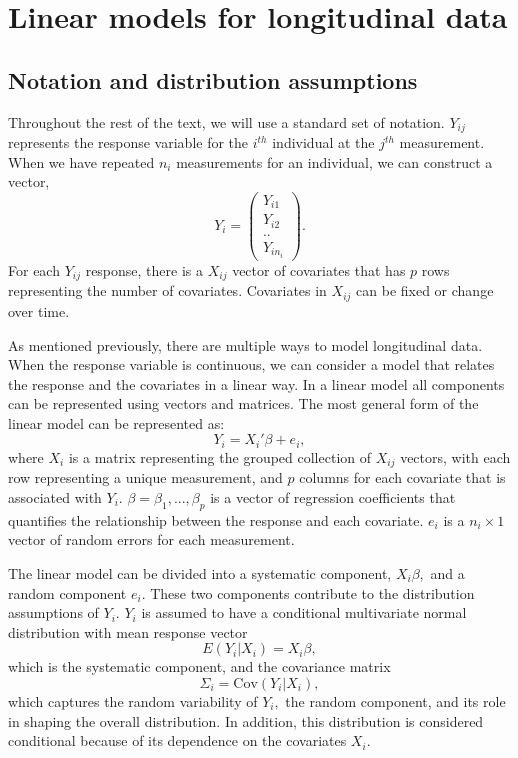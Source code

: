 \documentclass[12pt, twoside]{amherstthesis}
\begin{document}
\hypertarget{linear-models-for-longitudinal-data}{%
\section{Linear models for longitudinal data}\label{linear-models-for-longitudinal-data}}

\hypertarget{notation-and-distribution-assumptions}{%
\subsection{Notation and distribution assumptions}\label{notation-and-distribution-assumptions}}

Throughout the rest of the text, we will use a standard set of notation. \(Y_{ij}\) represents the response variable for the \(i^{th}\) individual at the \(j^{th}\) measurement. When we have repeated \(n_i\) measurements for an individual, we can construct a vector, \[Y_i = \begin{pmatrix} Y_{i1}\\ Y_{i2} \\ .. \\  Y_{in_i}  \end{pmatrix}.\] For each \(Y_{ij}\) response, there is a \(X_{ij}\) vector of covariates that has \(p\) rows representing the number of covariates. Covariates in \(X_{ij}\) can be fixed or change over time.

As mentioned previously, there are multiple ways to model longitudinal data. When the response variable is continuous, we can consider a model that relates the response and the covariates in a linear way. In a linear model all components can be represented using vectors and matrices. The most general form of the linear model can be represented as:
\[Y_i=X_i'\beta + e_i,\] where \(X_i\) is a matrix representing the grouped collection of \(X_{ij}\) vectors, with each row representing a unique measurement, and \(p\) columns for each covariate that is associated with \(Y_i.\) \(\beta = \beta_1,...,\beta_p\) is a vector of regression coefficients that quantifies the relationship between the response and each covariate. \(e_i\) is a \(n_i \times 1\) vector of random errors for each measurement.

The linear model can be divided into a systematic component, \(X_i\beta,\) and a random component \(e_i.\) These two components contribute to the distribution assumptions of \(Y_i.\) \(Y_i\) is assumed to have a conditional multivariate normal distribution with mean response vector \[E(Y_i|X_i) = X_i\beta,\] which is the systematic component, and the covariance matrix \[\Sigma_i = \text{Cov}(Y_i|X_i),\] which captures the random variability of \(Y_i,\) the random component, and its role in shaping the overall distribution. In addition, this distribution is considered conditional because of its dependence on the covariates \(X_i.\)
\end{document}
